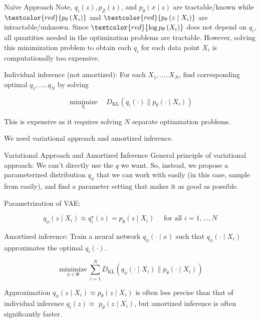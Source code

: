\begin{frame}[allowframebreaks]
\begin{myconceptblock}{11.9}{Naïve Approach}
    Note, $q_{i}(z), p_{Z}(z)$, and $p_{\theta}(x \mid z)$ are tractable/known while $\textcolor{red}{p_{\theta}\left(X_{i}\right)}$ and $\textcolor{red}{p_{\theta}\left(z \mid X_{i}\right)}$ are intractable/unknown. Since $\textcolor{red}{\log p_{\theta}\left(X_{i}\right)}$ does not depend on $q_{i}$, all quantities needed in the optimization problems are tractable. However, solving this minimization problem to obtain each $q_{i}$ for each data point $X_{i}$ is computationally too expensive.

    \par\noindent\textcolor{gray}{\hdashrule{\textwidth}{0.4pt}{1pt 2pt}}

    Individual inference (not amortized): For each $X_{1}, \ldots, X_{N}$, find corresponding optimal $q_{1}, \ldots, q_{N}$ by solving

    $$
    \underset{q_{i}}{\operatorname{minimize}} \quad D_{\mathrm{KL}}\left(q_{i}(\cdot) \| p_{\theta}\left(\cdot \mid X_{i}\right)\right)
    $$

    This is expensive as it requires solving $N$ separate optimization problems.

    We need variational approach and amortized inference.
\end{myconceptblock}

\end{frame}

\begin{frame}[allowframebreaks]

\begin{myconceptblock}{11.10}{Variational Approach and Amortized Inference}
    General principle of variational approach: We can't directly use the $q$ we want. So, instead, we propose a parameterized distribution $q_{\phi}$ that we can work with easily (in this case, sample from easily), and find a parameter setting that makes it as good as possible.

    Parametrization of VAE:

    $$
    q_{\phi}\left(z \mid X_{i}\right) \approx q_{i}^{\star}(z)=p_{\theta}\left(z \mid X_{i}\right) \quad \text { for all } i=1, \ldots, N
    $$

    Amortized inference: Train a neural network $q_{\phi}(\cdot \mid x)$ such that $q_{\phi}\left(\cdot \mid X_{i}\right)$ approximates the optimal $q_{i}(\cdot)$.

    $$
    \underset{\phi \in \Phi}{\operatorname{minimize}} \sum_{i=1}^{N} D_{\mathrm{KL}}\left(q_{\phi}\left(\cdot \mid X_{i}\right) \| p_{\theta}\left(\cdot \mid X_{i}\right)\right)
    $$

    Approximation $q_{\phi}\left(z \mid X_{i}\right) \approx p_{\theta}\left(z \mid X_{i}\right)$ is often less precise than that of individual inference $q_{i}(z) \approx$ $p_{\theta}\left(z \mid X_{i}\right)$, but amortized inference is often significantly faster.
\end{myconceptblock}

\end{frame}

